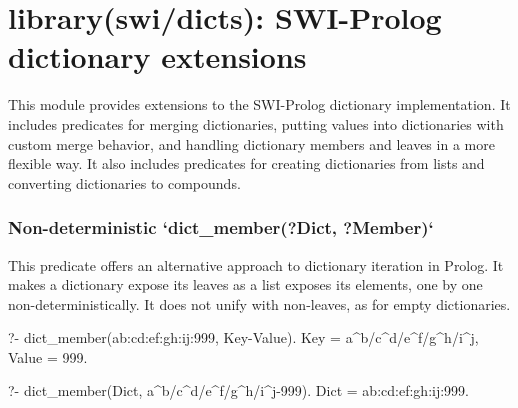 \chapter{library(swi/dicts): SWI-Prolog dictionary extensions}\label{sec:dicts}

This module provides extensions to the SWI-Prolog dictionary
implementation. It includes predicates for merging dictionaries,
putting values into dictionaries with custom merge behavior,
and handling dictionary members and leaves in a more flexible way.
It also includes predicates for creating dictionaries from lists
and converting dictionaries to compounds.

\subsection{Non-deterministic `dict_member(?Dict, ?Member)`}

This predicate offers an alternative approach to dictionary iteration in
Prolog. It makes a dictionary expose its leaves as a list exposes its
elements, one by one non-deterministically. It does not unify with
non-leaves, as for empty dictionaries.

\begin{code}
?- dict_member(a{b:c{d:e{f:g{h:i{j:999}}}}}, Key-Value).
Key = a^b/c^d/e^f/g^h/i^j,
Value = 999.

?- dict_member(Dict, a^b/c^d/e^f/g^h/i^j-999).
Dict = a{b:c{d:e{f:g{h:i{j:999}}}}}.
\end{code}

\vspace{0.7cm}

